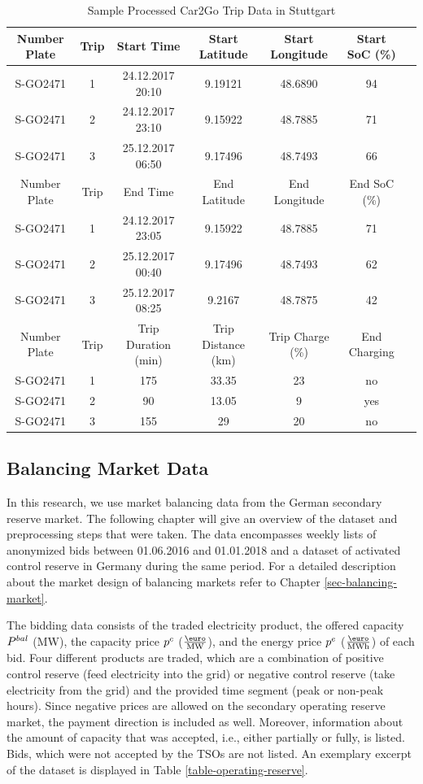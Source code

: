 \documentclass[a4paper, 12pt]{article}
\begin{document}
\begin{table}
    \caption{Sample Processed Car2Go Trip Data in Stuttgart \label{table-car2go-processed}}
    \centering
    \begin{tabular}{cc|ccccc}
      \hline
      \hline
      Number Plate & Trip & Start Time & Start Latitude & Start Longitude & Start SoC (\%)\\
      \hline
      S-GO2471 & 1 & 24.12.2017 20:10 & 9.19121 & 48.6890 & 94\\
      S-GO2471 & 2 & 24.12.2017 23:10 & 9.15922 & 48.7885 & 71\\
      S-GO2471 & 3 & 25.12.2017 06:50 & 9.17496 & 48.7493 & 66\\
      \hline
      Number Plate & Trip & End Time & End Latitude & End Longitude & End SoC (\%)\\
      \hline
      S-GO2471 & 1 & 24.12.2017 23:05 & 9.15922 & 48.7885 & 71\\
      S-GO2471 & 2 & 25.12.2017 00:40 & 9.17496 & 48.7493 & 62\\
      S-GO2471 & 3 & 25.12.2017 08:25 & 9.2167 & 48.7875 & 42\\
      \hline
      Number Plate & Trip & Trip Duration (min) & Trip Distance (km) & Trip Charge (\%) & End Charging\\
      \hline
      S-GO2471 & 1 & 175 & 33.35 & 23 & no\\
      S-GO2471 & 2 & 90 & 13.05 & 9 & yes\\
      S-GO2471 & 3 & 155 & 29 & 20 & no\\
      \hline
      \hline
    \end{tabular}
\end{table}

\subsection{Balancing Market Data \label{sec-data-balancing}}
\label{sec:orgc5a57a3}
In this research, we use market balancing data from the German secondary reserve
market. The following chapter will give an overview of the dataset and
preprocessing steps that were taken. The data encompasses weekly lists of
anonymized bids between 01.06.2016 and 01.01.2018 and a dataset of activated
control reserve in Germany during the same period. For a detailed description
about the market design of balancing markets refer to Chapter
\ref{sec-balancing-market}.

The bidding data consists of the traded electricity product, the offered
capacity \(P^{bal}_{}\) (MW), the capacity price \(p^c_{}\) (\(\emw\)), and the
energy price \(p^e_{}\) (\(\emwh\)) of each bid. Four different products
are traded, which are a combination of positive control reserve (feed
electricity into the grid) or negative control reserve (take electricity from
the grid) and the provided time segment (peak or non-peak hours). Since negative
prices are allowed on the secondary operating reserve market, the payment
direction is included as well. Moreover, information about the amount of
capacity that was accepted, i.e., either partially or fully, is listed. Bids,
which were not accepted by the TSOs are not listed. An exemplary excerpt of the
dataset is displayed in Table \ref{table-operating-reserve}.
\end{document}
